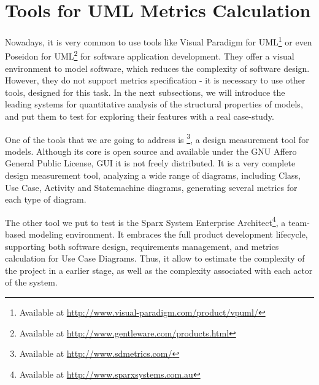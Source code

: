 \section{Tools for UML Metrics Calculation} \label{tools}

Nowadays, it is very common to use tools like \textsf{Visual Paradigm for UML\footnote{Available at \url{http://www.visual-paradigm.com/product/vpuml/}}} or even \textsf{Poseidon for UML}\footnote{Available at \url{http://www.gentleware.com/products.html}} for software application development.
They offer a visual environment to model software, which reduces the complexity of software design.
However, they do not support metrics specification - it is necessary to use other tools, designed for this task.
In the next subsections, we will introduce the leading systems for quantitative analysis of the structural properties of \umlS models, and put them to test for exploring their features with a real case-study.

One of the tools that we are going to address is \sdmetrics\footnote{Available at \url{http://www.sdmetrics.com/}}, a design measurement tool for \umlS models.
Although its core is open source and available under the GNU Affero General Public License, \sdmetricsS GUI it is not freely distributed. 
It is a very complete design measurement tool, analyzing a wide range of \umlS diagrams, including Class, Use Case, Activity and Statemachine diagrams, generating several metrics for each type of diagram.

The other tool we put to test is the \textsf{Sparx System Enterprise Architect}{\footnote{Available at \url{http://www.sparxsystems.com.au}}}, a team-based modeling environment. 
It embraces the full product development lifecycle, supporting both software design, requirements management, and metrics calculation for Use Case Diagrams.
Thus, it allow to estimate the complexity of the project in a earlier stage, as well as the complexity associated with each actor of the system.
